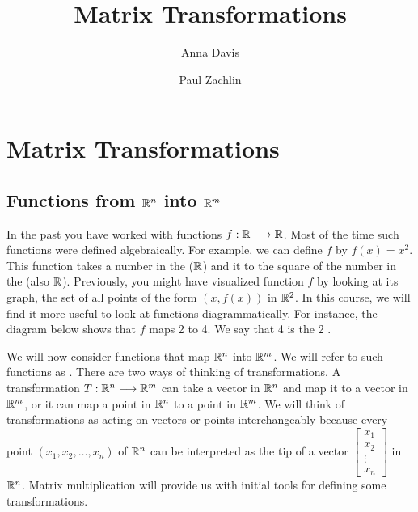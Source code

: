 \documentclass{ximera}
\author{Anna Davis \and Paul Zachlin} \title{Matrix Transformations} \license{CC-BY 4.0}
\begin{document}
\begin{abstract}
\end{abstract}
\maketitle
\section*{Matrix Transformations}
\subsection*{Functions from $\mathbb{R}^n$ into $\mathbb{R}^m$}
In the past you have worked with functions $f:\mathbb{R}\longrightarrow \mathbb{R}$.  Most of the time such functions were defined algebraically.  For example, we can define $f$ by $f(x)=x^2$.  This function takes a number in the  ($\mathbb{R}$) and  it to the square of the number in the  (also $\mathbb{R}$).  Previously, you might have visualized function $f$ by looking at its graph, the set of all points of the form $(x, f(x))$ in $\mathbb{R}^2$.  In this course, we will find it more useful to look at functions diagrammatically.  For instance, the diagram below shows that $f$ maps 2 to 4.  We say that 4 is the  2 .
\begin{center}
\end{center}

We will now consider functions that map $\mathbb{R}^n$ into $\mathbb{R}^m$.  We will refer to such functions as .  There are two ways of thinking of transformations.  A transformation $T:\mathbb{R}^n\longrightarrow\mathbb{R}^m$ can take a vector in $\mathbb{R}^n$ and map it to a vector in $\mathbb{R}^m$, or it can map a point in $\mathbb{R}^n$ to a point in $\mathbb{R}^m$.  We will think of transformations as acting on vectors or points interchangeably because every point $(x_1, x_2,\dots ,x_n)$ of $\mathbb{R}^n$ can be interpreted as the tip of a vector $\begin{bmatrix}x_1\\x_2\\\vdots\\x_n\end{bmatrix}$ in $\mathbb{R}^n$.  Matrix multiplication will provide us with initial tools for defining some transformations.
\end{document}
